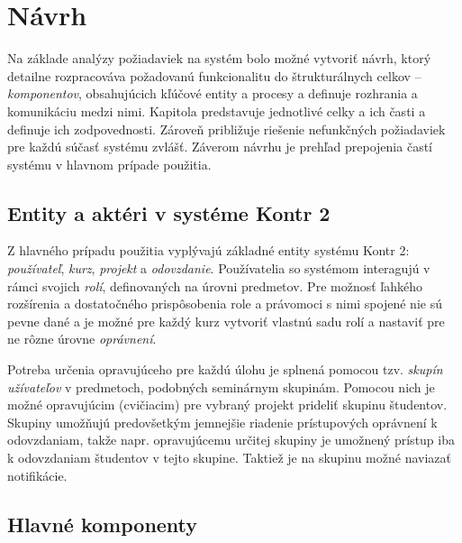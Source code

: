 \documentclass[
  digital, %
  twoside, %
  table,   %
  lof,     %
  lot,     %
]{fithesis3}
\begin{document}
\chapter{Návrh}
Na základe analýzy požiadaviek na systém bolo možné vytvoriť návrh, ktorý detailne rozpracováva požadovanú funkcionalitu do štrukturálnych celkov -- \emph{komponentov}, obsahujúcich kľúčové entity a procesy a definuje rozhrania a komunikáciu medzi nimi. Kapitola predstavuje jednotlivé celky a ich časti a definuje ich zodpovednosti. Zároveň približuje riešenie nefunkčných požiadaviek pre každú súčasť systému zvlášť. Záverom návrhu je prehľad prepojenia častí systému v hlavnom prípade použitia. 


\section{Entity a aktéri v systéme Kontr 2}

Z hlavného prípadu použitia vyplývajú základné entity systému Kontr 2: \emph{používateľ}, \emph{kurz}, \emph{projekt} a \emph{odovzdanie}. Používatelia so systémom interagujú v rámci svojich \emph{rolí}, definovaných na úrovni predmetov. Pre možnosť ľahkého rozšírenia a dostatočného prispôsobenia role a právomoci s nimi spojené nie sú pevne dané a je možné pre každý kurz vytvoriť vlastnú sadu rolí a nastaviť pre ne rôzne úrovne \emph{oprávnení}.

Potreba určenia opravujúceho pre každú úlohu je splnená pomocou tzv. \emph{skupín užívateľov} v predmetoch, podobných seminárnym skupinám. Pomocou nich je možné opravujúcim (cvičiacim) pre vybraný projekt prideliť skupinu študentov. Skupiny umožňujú predovšetkým jemnejšie riadenie prístupových oprávnení k odovzdaniam, takže napr. opravujúcemu určitej skupiny je umožnený prístup iba k odovzdaniam študentov v tejto skupine. Taktiež je na skupinu možné naviazať notifikácie.

\section{Hlavné komponenty}
\end{document}
